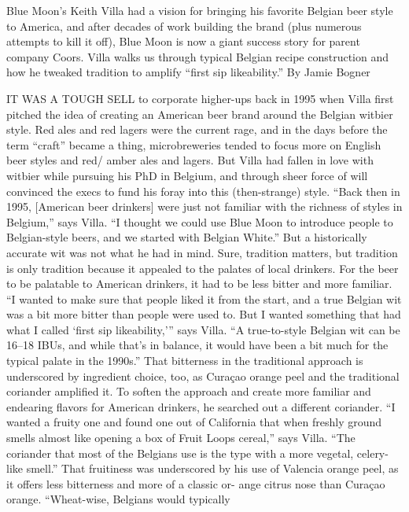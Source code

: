 \documentclass[a4paper,parskip=half]{scrartcl}
\begin{document}
\parencite[76\psq]{Bogner2019}

Blue Moon’s Keith Villa had a vision for bringing his favorite Belgian beer
style to America, and after decades of work building the brand (plus numerous
attempts to kill it off), Blue Moon is now a giant success story for parent
company Coors. Villa walks us through typical Belgian recipe construction and
how he tweaked tradition to amplify “first sip likeability.” By Jamie Bogner

IT WAS A TOUGH SELL to corporate
higher-ups back in 1995 when Villa first
pitched the idea of creating an American
beer brand around the Belgian witbier style.
Red ales and red lagers were the current
rage, and in the days before the term “craft”
became a thing, microbreweries tended to
focus more on English beer styles and red/
amber ales and lagers. But Villa had fallen
in love with witbier while pursuing his PhD
in Belgium, and through sheer force of will
convinced the execs to fund his foray into
this (then-strange) style.
“Back then in 1995, [American beer
drinkers] were just not familiar with the
richness of styles in Belgium,” says Villa.
“I thought we could use Blue Moon to
introduce people to Belgian-style beers,
and we started with Belgian White.”
But a historically accurate wit was not what
he had in mind. Sure, tradition matters, but
tradition is only tradition because it appealed
to the palates of local drinkers. For the beer
to be palatable to American drinkers, it had
to be less bitter and more familiar.
“I wanted to make sure that people liked
it from the start, and a true Belgian wit
was a bit more bitter than people were
used to. But I wanted something that had
what I called ‘first sip likeability,’” says
Villa. “A true-to-style Belgian wit can be
16–18 IBUs, and while that’s in balance, it
would have been a bit much for the typical
palate in the 1990s.”
That bitterness in the traditional
approach is underscored by ingredient
choice, too, as Curaçao orange peel and the
traditional coriander amplified it. To soften
the approach and create more familiar and
endearing flavors for American drinkers,
he searched out a different coriander. “I
wanted a fruity one and found one out of
California that when freshly ground smells
almost like opening a box of Fruit Loops
cereal,” says Villa. “The coriander that
most of the Belgians use is the type with a
more vegetal, celery-like smell.”
That fruitiness was underscored by his
use of Valencia orange peel, as it offers
less bitterness and more of a classic or-
ange citrus nose than Curaçao orange.
“Wheat-wise, Belgians would typically
\end{document}
